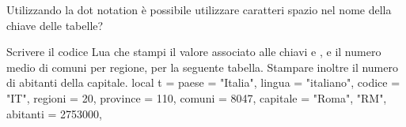 \begin{Exercise}[label={tab-02}]
Utilizzando la dot notation è possibile utilizzare caratteri spazio nel nome
della chiave delle tabelle?
\end{Exercise}

\begin{Exercise}[label={tab-03}]
Scrivere il codice Lua che stampi il valore associato alle chiavi  e
, e il numero medio di comuni per regione, per la seguente tabella.
Stampare inoltre il numero di abitanti della capitale.
\lines
local t = {
    paese = "Italia",
    lingua = "italiano",
    codice = "IT",
    regioni = 20,
    province = 110,
    comuni = 8047,
    capitale = {"Roma", "RM", abitanti = 2753000},
}
\endlines
{}
\end{Exercise}


